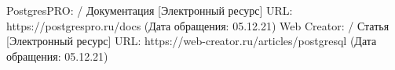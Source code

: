 
\begin{thebibliography}{7}
     PostgresPRO: / Документация [Электронный ресурс] URL: https://postgrespro.ru/docs (Дата обращения: 05.12.21)
     Web Creator: / Статья [Электронный ресурс] URL: https://web-creator.ru/articles/postgresql (Дата обращения: 05.12.21)
\end{thebibliography}

\newpage